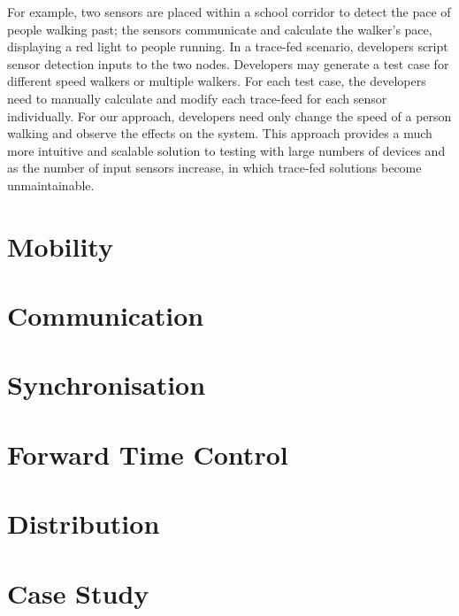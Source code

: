 For example, two sensors are placed within a school corridor to detect the pace of people walking past; the sensors communicate and calculate the walker's pace, displaying a red light to people running. In a trace-fed scenario, developers script sensor detection inputs to the two nodes. Developers may generate a test case for different speed walkers or multiple walkers. For each test case, the developers need to manually calculate and modify each trace-feed for each sensor individually. For our approach, developers need only change the speed of a person walking and observe the effects on the system. This approach provides a much more intuitive and scalable solution to testing with large numbers of devices and as the number of input sensors increase, in which trace-fed solutions become unmaintainable.  

\section{Mobility} %
\label{sec:mobility}

\section{Communication} %
\label{sec:communication}

\section{Synchronisation} %
\label{sec:synchronisation}




\section{Forward Time Control} %
\label{sec:time_control}

\section{Distribution} %
\label{sec:distribution}


\section{Case Study}
\label{sec:Case Study: Corridor}

